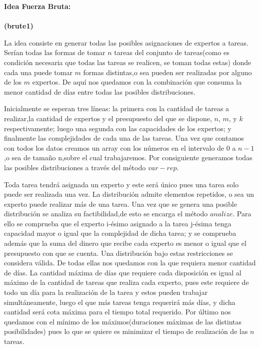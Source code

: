 \documentclass[10pt,letterpaper]{article}
\begin{document}
{ 	
 	
 	{\Large \bf Idea Fuerza Bruta:}\\ \\
 		{\small \bf (brute1)}
 	
 	La idea consiste en generar todas las posibles asignaciones de expertos a tareas. Ser\'ian todas las formas de tomar $n$ tareas del conjunto de tareas(como es condici\'on necesaria que todas las tareas se realicen, se toman todas estas) donde cada una puede tomar $m$ formas distintas,o sea pueden ser realizadas por alguno de los $m$ expertos. De aqu\'i nos quedamos con la combinaci\'on que consuma la menor cantidad de d\'ias entre todas las posibles distribuciones.
 	
 	Inicialmente se esperan tres l\'ineas: la primera con la cantidad de tareas a realizar,la cantidad de expertos y el presupuesto del que se dispone, $n$, $m$, y $k$ respectivamente; luego una segunda con las capacidades de los expertos; y finalmente las complejidades de cada una de las tareas. Una vez que contamos con todos los datos creamos un array con los n\'umeros en el intervalo de $0$ a $n-1$,o sea de tama\~no n,sobre el cual trabajaremos. Por consiguiente generamos todas las posibles distribuciones a trav\'es del m\'etodo $var-rep$.
 	
 	Toda tarea tendr\'a asignada un experto y este ser\'a \'unico pues una tarea solo puede ser realizada una vez. La distribuci\'on admite elementos repetidos, o sea un experto puede realizar m\'as de una tarea. Una vez que se genera una posible distribuci\'on se analiza su factibilidad,de esto se encarga el m\'etodo $analize$. Para ello se comprueba que el experto i-\'esimo asignado a la tarea j-\'esima tenga capacidad mayor o igual que la complejidad de dicha tarea; y se comprueba adem\'as que la suma del dinero que recibe cada experto es menor o igual que el presupuesto con que se cuenta. Una distribuci\'on bajo estas restricciones se considera v\'alida. De todas ellas nos quedamos con la que requiera menor cantidad de d\'ias. La cantidad m\'axima de d\'ias que requiere cada disposici\'on es igual al m\'aximo de la cantidad de tareas que realiza cada experto, pues este requiere de todo un d\'ia para la realizaci\'on de la tarea y estos pueden trabajar simult\'aneamente, luego el que m\'as tareas tenga requerir\'a m\'as d\'ias, y dicha cantidad ser\'a cota m\'axima para el tiempo total requerido. Por \'ultimo nos quedamos con el m\'inimo de los m\'aximos(duraciones m\'aximas de las distintas posibilidades) pues lo que se quiere es minimizar el tiempo de realizaci\'on de las $n$ tareas.
 	
}
\end{document}
